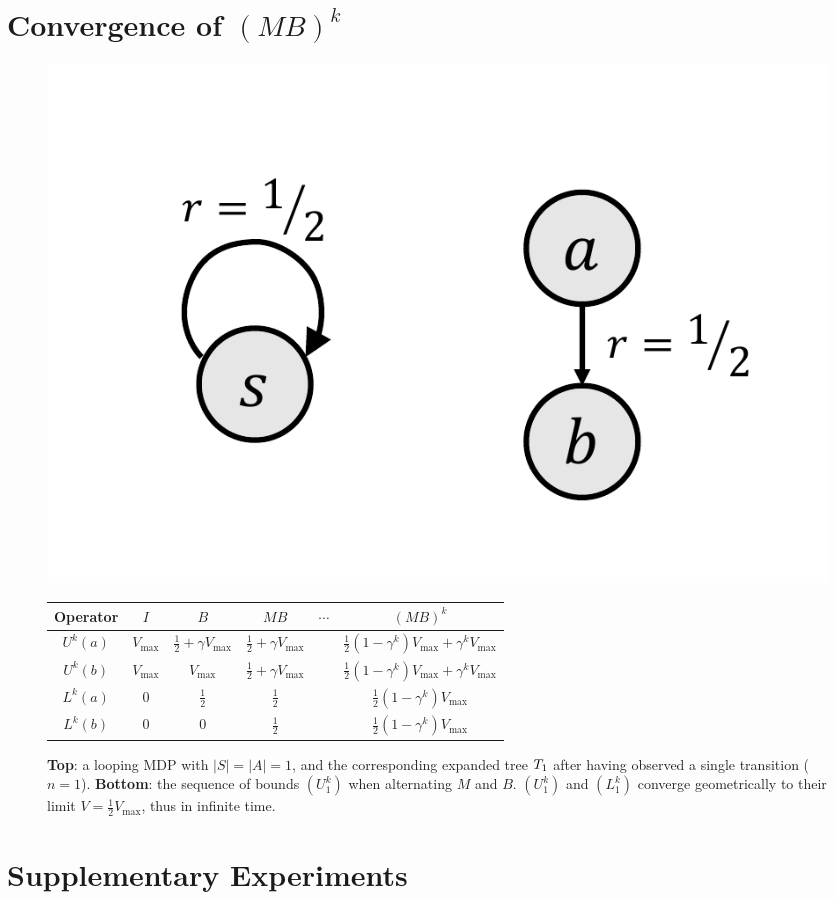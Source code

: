 \documentclass[runningheads]{llncs}
\begin{document}
\section{Convergence of $(M B)^k$}
\label{sec:convergence}
\begin{figure}[H]
    \centering
    \includegraphics[trim=2.5cm 1cm 1.5cm 2cm, clip, width=0.35\linewidth]{img/loop.pdf}\\
    \begin{tabular}{cccccc}
         \toprule
         Operator & $I$ & $B$ & $M B$ & $\cdots$ & $(M B)^k$ \\
         \midrule
         $U^k(a)$ & $V_{\max}$ & $\frac{1}{2} + \gamma V_{\max}$ & $\frac{1}{2} + \gamma V_{\max}$ && $\frac{1}{2}(1-\gamma^k)V_{\max} + \gamma^k V_{\max}$\\
         $U^k(b)$ & $V_{\max}$ & $V_{\max}$ & $\frac{1}{2} + \gamma V_{\max}$ && $\frac{1}{2}(1-\gamma^k)V_{\max} + \gamma^k V_{\max}$\\
         $L^k(a)$ & $0$ & $\frac{1}{2}$ & $\frac{1}{2}$ && $\frac{1}{2}(1-\gamma^k)V_{\max}$\\
		 $L^k(b)$ & $0$ & $0$ & $\frac{1}{2}$ && $\frac{1}{2}(1-\gamma^k)V_{\max}$\\
         \bottomrule
    \end{tabular}
    \caption{\textbf{Top}: a looping MDP with $|S|=|A|=1$, and the corresponding expanded tree $T_1$ after having observed a single transition ($n=1$). \textbf{Bottom}: the sequence of bounds $(U_1^k)$ when alternating $M$ and $B$. $(U_1^k)$ and $(L_1^k)$ converge geometrically to their limit $V = \frac{1}{2}V_{\max}$, thus in infinite time.}
    \label{fig:simple_loop}
\end{figure}

\section{Supplementary Experiments}
\end{document}
